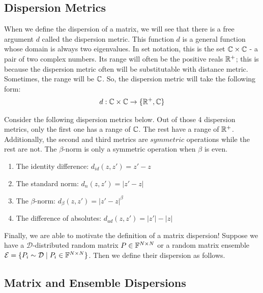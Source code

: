 
\subsection{Dispersion Metrics}

When we define the dispersion of a matrix, we will see that there is a free argument $d$ called the dispersion metric. This function $d$ is a general function whose domain is always two eigenvalues. In set notation, this is the set $\mathbb{C} \times \mathbb{C}$ - a pair of two complex numbers. Its range will often be the positive reals $\mathbb{R}^+$; this is because the dispersion metric often will be substitutable with distance metric. Sometimes, the range will be $\mathbb{C}$. So, the dispersion metric will take the following form:
\begin{align*}
d: \mathbb{C} \times \mathbb{C} \to \{\mathbb{R}^+, \mathbb{C}\}
\end{align*}

Consider the following dispersion metrics below. Out of those 4 dispersion metrics, only the first one has a range of $\mathbb{C}$. The rest have a range of $\mathbb{R}^+$. Additionally, the second and third metrics are $\textit{symmetric}$ operations while the rest are not. The $\beta$-norm is only a symmetric operation when $\beta$ is even.

\begin{enumerate}
\item The identity difference: $d_{id}(z,z') = z' - z$
\item The standard norm: $d_{n}(z,z') = |z' - z|$
\item The $\beta$-norm: $d_\beta(z,z') = |z' - z|^\beta$
\item The difference of absolutes: $d_{ad}(z,z') = |z'| - |z|$
\end{enumerate}

Finally, we are able to motivate the definition of a matrix dispersion! Suppose we have a $\mathcal{D}$-distributed random matrix $P \in \mathbb{F}^{N \times N}$ or a random matrix ensemble $\mathcal{E} = \{P_i \sim \mathcal{D} \mid P_i \in \mathbb{F}^{N \times N}\}$. Then we define their dispersion as follows. 


\subsection{Matrix and Ensemble Dispersions}

